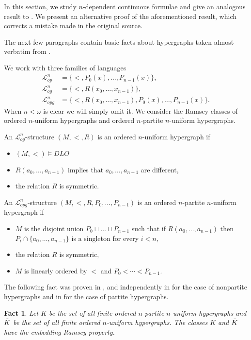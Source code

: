 \documentclass{amsart}
\newtheorem{fact}[teor]{Fact}
\newtheorem{external claim}[teor]{Claim}
\newcommand{\mL}{\mathcal{L}}
\begin{document}
 In this section, we study $n$-dependent continuous formulae and give an analogous result to \cite[Theorem 5.4]{Chernikov2014OnN}. We present an alternative proof of the aforementioned result, which corrects a mistake made in the original source. 

The next few paragraphs contain basic facts about hypergraphs taken almost verbatim from \cite{Chernikov2014OnN}.

We work with three families of languages 
\begin{align*}
    \mL^n_{op}&=\{<, P_0(x),\dots, P_{n-1}(x)\},\\
    \mL^n_{og}&=\{<, R(x_0,\dots,x_{n-1})\},\\
    \mL^n_{opg}&=\{<, R(x_0,\dots,x_{n-1}), P_0(x),\dots, P_{n-1}(x)\}.
\end{align*}
  When $n<\omega$ is clear we will simply omit it. We consider the Ramsey classes of ordered $n$-uniform hypergraphs and ordered $n$-partite $n$-uniform hypergraphs.

An $\mL^n_{og}$-structure $(M,<,R)$ is an ordered $n$-uniform hypergraph if 
\begin{itemize}
    \item $(M,<)\models DLO$
    \item $R(a_0,\dots,a_{n-1})$ implies that $a_0,\dots,a_{n-1}$ are different,
    \item the relation $R$ is symmetric.
\end{itemize}

An $\mL^n_{opg}$-structure $(M,<,R,P_0,\dots,P_{n-1})$ is an ordered $n$-partite $n$-uniform hypergraph if
\begin{itemize}
    \item $M$ is the disjoint union $P_0\sqcup \dots \sqcup P_{n-1}$ such that if $R(a_0,\dots,a_{n-1})$ then $P_i\cap \{a_0,\dots,a_{n-1}\}$ is a singleton for every $i<n$,
    \item the relation $R$ is symmetric,
    \item $M$ is linearly ordered by $<$ and $P_0<\cdots<P_{n-1}$.
\end{itemize}

The following fact was proven in \cite{NESETRIL1977289}, \cite{NESETRIL1983183} and independently in \cite{1a7d4f5c-0dcd-37ec-b761-69bf07cad14f} for the case of nonpartite hypergraphs and in \cite{Chernikov2014OnN} for the case of partite hypergraphs.

\begin{fact} \label{fact: ordered hypergraphs are ramsey}
Let $K$ be the set of all finite ordered $n$-partite $n$-uniform hypergraphs and $\Tilde{K}$ be the set of all finite ordered $n$-uniform hypergraphs. The classes $K$ and $\Tilde{K}$ have the embedding Ramsey property.
\end{fact}
\end{document}
